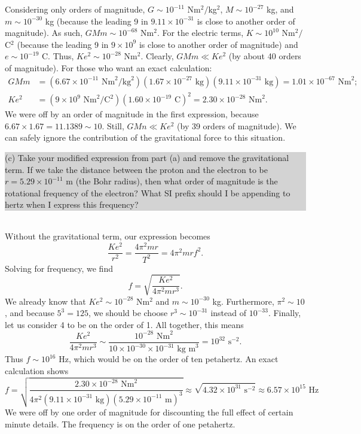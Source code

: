 \documentclass[]{article}
\newcommand{\excerpt}[1]{\colorbox{lightgray}{\parbox{14.8cm}{#1}} \\}
\begin{document}
Considering only orders of magnitude, $ G \sim 10^{-11} $ Nm$ ^{2}/ $kg$ ^{2} $, $ M \sim 10^{-27} $ kg, and $ m \sim 10^{-30} $ kg (because the leading 9 in $ 9.11\times10^{-31} $ is close to another order of magnitude). As such, $ GMm \sim 10^{-68} $ Nm$ ^{2} $. For the electric terms, $ K \sim 10^{10} $ Nm$ ^{2}/ $C$ ^{2} $ (because the leading 9 in $ 9\times10^{9} $ is close to another order of magnitude) and $ e \sim 10^{-19} $ C. Thus, $ Ke^{2} \sim 10^{-28} $ Nm$ ^{2} $. Clearly, $ GMm \ll Ke^{2} $ (by about 40 orders of magnitude). For those who want an exact calculation:
\[
\begin{split}
	GMm & = (6.67\times10^{-11}\text{ Nm}^{2}/\text{kg}^{2})(1.67\times10^{-27}\text{ kg})(9.11\times10^{-31}\text{ kg}) = 1.01\times10^{-67} \text{ Nm}^{2}; \\
	Ke^{2} & = (9\times10^{9}\text{ Nm}^{2}/\text{C}^{2})(1.60\times10^{-19}\text{ C})^{2} = 2.30\times10^{-28}\text{ Nm}^{2}.
\end{split}
\]
We were off by an order of magnitude in the first expression, because $ 6.67\times1.67 = 11.1389 \sim 10 $. Still, $ GMn \ll Ke^{2} $ (by 39 orders of magnitude). We can safely ignore the contribution of the gravitational force to this situation. \\
\excerpt{
(c) Take your modified expression from part (a) and remove the gravitational term. If we take the distance between the proton and the electron to be $ r = 5.29\times10^{-11} $ m (the Bohr radius), then what order of magnitude is the rotational frequency of the electron? What SI prefix should I be appending to hertz when I express this frequency?
}


Without the gravitational term, our expression becomes
\[
\frac{Ke^{2}}{r^{2}} = \frac{4\pi^{2}mr}{T^{2}} = 4\pi^{2}mrf^{2}.
\]
Solving for frequency, we find
\[
f = \sqrt{\frac{Ke^{2}}{4\pi^{2}mr^{3}}}.
\]
We already know that $ Ke^{2} \sim 10^{-28} $ Nm$ ^{2} $ and $ m \sim 10^{-30} $ kg. Furthermore, $ \pi^{2} \sim 10 $, and because $ 5^{3} = 125 $, we should be choose $ r^{3} \sim 10^{-31} $ instead of $ 10^{-33} $. Finally, let us consider 4 to be on the order of 1. All together, this means
\[
\frac{Ke^{2}}{4\pi^{2}mr^{3}} \sim \frac{10^{-28}\text{ Nm}^{2}}{10\times10^{-30}\times10^{-31}\text{ kg m}^{3}} = 10^{32}\text{ s}^{-2}.
\]
Thus $ f \sim 10^{16} $ Hz, which would be on the order of ten petahertz. An exact calculation shows
\[
f = \sqrt{\frac{2.30\times10^{-28}\text{ Nm}^{2}}{4\pi^{2}(9.11\times10^{-31}\text{ kg})(5.29\times10^{-11}\text{ m})^{3}}} \approx \sqrt{4.32\times10^{31}\text{ s}^{-2}} \approx 6.57\times10^{15}\text{ Hz}
\]
We were off by one order of magnitude for discounting the full effect of certain minute details. The frequency is on the order of one petahertz.
\end{document}
